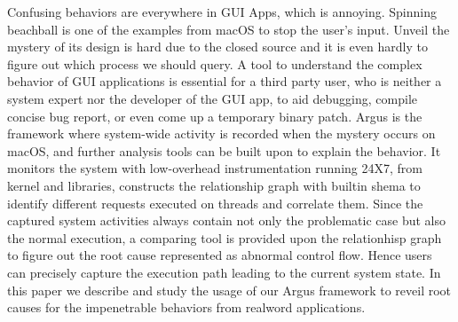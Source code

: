 Confusing behaviors are everywhere in GUI Apps, which is annoying.
Spinning beachball is one of the examples from macOS to stop the user's input.
Unveil the mystery of its design is hard due to the closed source and it is even hardly to figure out which process we should query.
A tool to understand the complex behavior of GUI applications is essential for a third party user, who is neither a system expert nor the developer of the GUI app, to aid debugging, compile concise bug report, or even come up a temporary binary patch.
Argus is the framework where system-wide activity is recorded when the mystery occurs on macOS, and further analysis tools can be built upon to explain the behavior. 
It monitors the system with low-overhead instrumentation running 24X7, from kernel and libraries, constructs the relationship graph with builtin shema to identify different requests executed on threads and correlate them.
Since the captured system activities always contain not only the problematic case but also the normal execution, a comparing tool is provided upon the relationhisp graph to figure out the root cause represented as abnormal control flow.
Hence users can precisely capture the execution path leading to the current system state.
In this paper we describe and study the usage of our Argus framework to reveil root causes for the impenetrable behaviors from realword applications.
